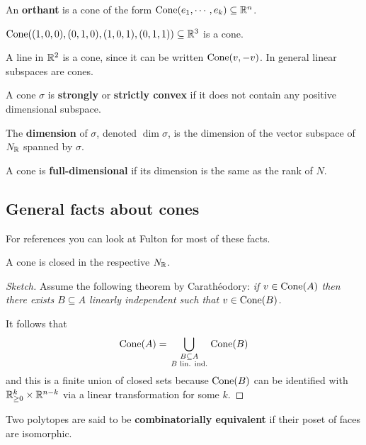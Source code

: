 \begin{definition}[Orthant]
An \textbf{orthant} is a cone of the form $\operatorname{Cone}(e_1,\cdots, e_k)\subseteq \mathbb{R}^n$.
\end{definition}

\begin{example}
$\operatorname{Cone}((1,0,0),(0,1,0),(1,0,1),(0,1,1))\subseteq \mathbb{R}^3$ is a cone.
\end{example}

\begin{example}
A line in $\mathbb{R}^2$ is a cone, since it can be written $\operatorname{Cone}(v,-v)$. In general linear subspaces are cones.
\end{example}


\begin{definition}[]
A cone $\sigma$ is \textbf{strongly} or \textbf{strictly convex} if it does not contain any positive dimensional subspace.
\end{definition}

\begin{definition}[]
The \textbf{dimension} of $\sigma$, denoted $\dim\sigma$, is the dimension of the vector subspace of $N_{\mathbb{R}}$ spanned by $\sigma$.

A cone is \textbf{full-dimensional} if its dimension is the same as the rank of $N$.
\end{definition}


\subsection{General facts about cones}
For references you can look at Fulton \cite{fulton1993introduction} for most of these facts.

\begin{proposition}
A cone is closed in the respective $N_{\mathbb{R}}$.
\end{proposition}
\begin{proof}[Sketch]
Assume the following theorem by Carath\'eodory: \textit{if $v\in \operatorname{Cone}(A)$ then there exists $B\subseteq A$ linearly independent such that $v\in \operatorname{Cone}(B)$.}
\medskip

\noindent
It follows that
\[\operatorname{Cone}(A)=\bigcup_{\begin{smallmatrix}B\subseteq A\\B\text{ lin. ind.}\end{smallmatrix}}\operatorname{Cone}(B)\]
and this is a finite union of closed sets because $\operatorname{Cone}(B)$ can be identified with $\mathbb{R}^{k}_{\geq 0}\times \mathbb{R}^{n-k}$ via a linear transformation for some $k$.
\end{proof}

\begin{definition}[]
Two polytopes are said to be \textbf{combinatorially equivalent} if their poset of faces are isomorphic.
\end{definition}

